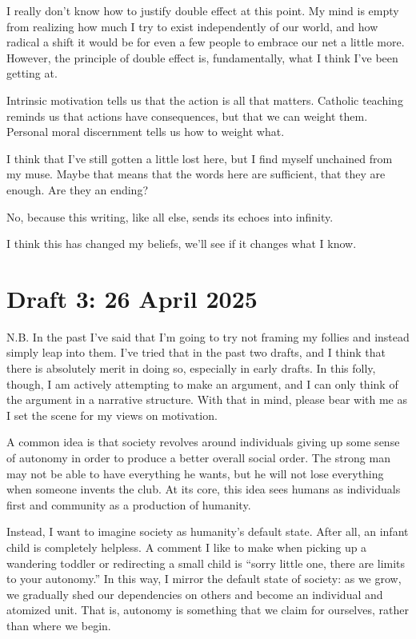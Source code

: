\documentclass[12pt]{article}
\newcommand{\say}[1]{``#1''}
\renewcommand{\,}{\textsuperscript{,}}
\begin{document}
I really don't know how to justify double effect at this point.  
My mind is empty from realizing how much I try to exist independently of our world, and how radical a shift it would be for even a few people to embrace our net a little more.  
However, the principle of double effect is, fundamentally, what I think I've been getting at.

Intrinsic motivation tells us that the action is all that matters.  
Catholic teaching reminds us that actions have consequences, but that we can weight them.  
Personal moral discernment tells us how to weight what.

I think that I've still gotten a little lost here, but I find myself unchained from my muse.  
Maybe that means that the words here are sufficient, that they are enough.  
Are they an ending?

No, because this writing, like all else, sends its echoes into infinity.

I think this has changed my beliefs, we'll see if it changes what I know.

\section{Draft 3: 26 April 2025}

N.B. In the past I've said that I'm going to try not framing my follies and instead simply leap into them.  
I've tried that in the past two drafts, and I think that there is absolutely merit in doing so, especially in early drafts.  
In this folly, though, I am actively attempting to make an argument, and I can only think of the argument in a narrative structure.  
With that in mind, please bear with me as I set the scene for my views on motivation.

A common idea is that society revolves around individuals giving up some sense of autonomy in order to produce a better overall social order.  
The strong man may not be able to have everything he wants, but he will not lose everything when someone invents the club.  
At its core, this idea sees humans as individuals first and community as a production of humanity.

Instead, I want to imagine society as humanity's default state.  
After all, an infant child is completely helpless.  
A comment I like to make when picking up a wandering toddler or redirecting a small child is \say{sorry little one, there are limits to your autonomy.}  
In this way, I mirror the default state of society: as we grow, we gradually shed our dependencies on others and become an individual and atomized unit.  
That is, autonomy is something that we claim for ourselves, rather than where we begin.
\end{document}
